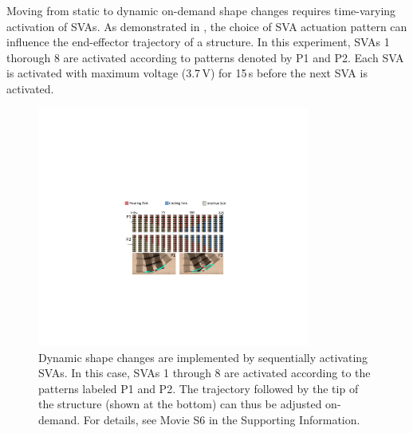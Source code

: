 Moving from static to dynamic on-demand shape changes requires time-varying activation of SVAs.
As demonstrated in , the choice of SVA actuation pattern can influence the end-effector trajectory of a structure. In this experiment, SVAs 1 thorough 8 are activated according to patterns denoted by P1 and P2. Each SVA is activated with maximum voltage (3.7\,V) for 15\,s before the next SVA is activated.
\begin{figure}[!ht]
\centering
\includegraphics[width=0.8\textwidth]{armTrajOnOff.pdf}
\caption[Dynamic shape changes by On/Off signals]{Dynamic shape changes are implemented by sequentially activating SVAs. In this case, SVAs 1 through 8 are activated according to the patterns labeled P1 and P2. The trajectory followed by the tip of the structure (shown at the bottom) can thus be adjusted on-demand. For details, see Movie S6 in the Supporting Information.}
\label{fig:armTrajOnOff}
\end{figure}

